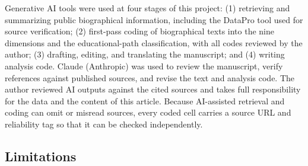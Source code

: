 \documentclass[11pt,a4paper]{article}
\begin{document}
Generative AI tools were used at four stages of this project: (1) retrieving and summarizing public biographical information, including the DataPro tool used for source verification; (2) first-pass coding of biographical texts into the nine dimensions and the educational-path classification, with all codes reviewed by the author; (3) drafting, editing, and translating the manuscript; and (4) writing analysis code. Claude (Anthropic) was used to review the manuscript, verify references against published sources, and revise the text and analysis code. The author reviewed AI outputs against the cited sources and takes full responsibility for the data and the content of this article. Because AI-assisted retrieval and coding can omit or misread sources, every coded cell carries a source URL and reliability tag so that it can be checked independently.

\subsection{Limitations}
\label{sec:limits}
\end{document}
